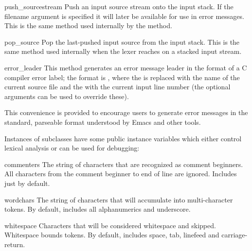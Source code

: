 \begin{methoddesc}{push_source}{stream}
Push an input source stream onto the input stack.  If the filename
argument is specified it will later be available for use in error
messages.  This is the same method used internally by the
 method.
\end{methoddesc}

\begin{methoddesc}{pop_source}{}
Pop the last-pushed input source from the input stack.
This is the same method used internally when the lexer reaches
\EOF{} on a stacked input stream.
\end{methoddesc}

\begin{methoddesc}{error_leader}{}
This method generates an error message leader in the format of a
\UNIX{} C compiler error label; the format is ,
where the  is replaced with the name of the current source
file and the  with the current input line number (the
optional arguments can be used to override these).

This convenience is provided to encourage  users to
generate error messages in the standard, parseable format understood
by Emacs and other \UNIX{} tools.
\end{methoddesc}

Instances of  subclasses have some public instance
variables which either control lexical analysis or can be used for
debugging:

\begin{memberdesc}{commenters}
The string of characters that are recognized as comment beginners.
All characters from the comment beginner to end of line are ignored.
Includes just \character{\#} by default.   
\end{memberdesc}

\begin{memberdesc}{wordchars}
The string of characters that will accumulate into multi-character
tokens.  By default, includes all \ASCII{} alphanumerics and
underscore.
\end{memberdesc}

\begin{memberdesc}{whitespace}
Characters that will be considered whitespace and skipped.  Whitespace
bounds tokens.  By default, includes space, tab, linefeed and
carriage-return.
\end{memberdesc}

